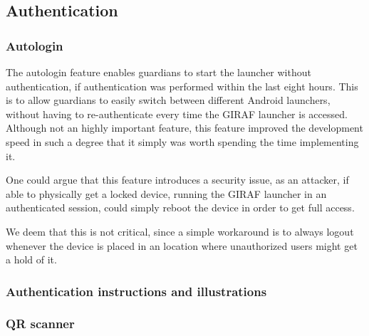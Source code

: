 \subsection{Authentication}
\label{backlog:authentication}

\subsubsection{Autologin}
\label{backlog:autologin}

The autologin feature enables guardians to start the launcher without authentication, if authentication was performed within the last eight hours. This is to allow guardians to easily switch between different Android launchers, without having to re-authenticate every time the GIRAF launcher is accessed. Although not an highly important feature, this feature improved the development speed in such a degree that it simply was worth spending the time implementing it.

One could argue that this feature introduces a security issue, as an attacker, if able to physically get a locked device, running the GIRAF launcher in an authenticated session, could simply reboot the device in order to get full access.

We deem that this is not critical, since a simple workaround is to always logout whenever the device is placed in an location where unauthorized users might get a hold of it.

\subsubsection{Authentication instructions and illustrations}
\label{backlog:authentication_illustrations}

\subsubsection{QR scanner}
\label{backlog:QR_scanner}